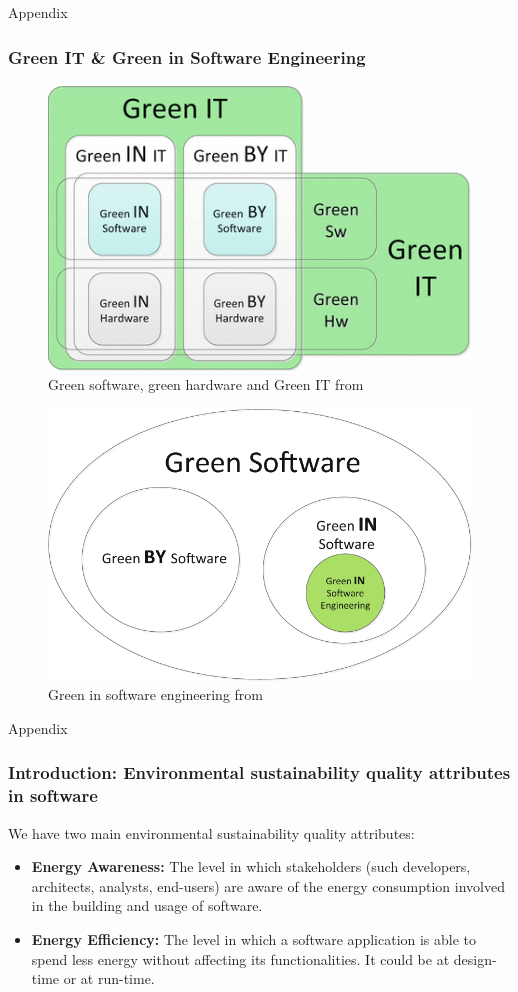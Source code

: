 \documentclass{beamer}
\begin{document}
\begin{frame}{Appendix}
\hypertarget{Intro_1}{}
  \frametitle{Green IT \& Green in Software Engineering}
  
 \begin{figure}
     \vspace*{-0.25cm} %
    \centering
    \includegraphics[width=.4\textwidth]{figures/Slide_2(Green software, green hardware and Green IT).png}
    \captionsetup{justification=centering} %
    \caption{\small Green software, green hardware and Green IT from \cite{calero2015introduction}}
    \label{fig:Green software, green hardware and Green IT}
 \end{figure}
 
 \begin{figure}
     \vspace*{-0.5cm} %
    \centering
    \includegraphics[width=.4\textwidth]{figures/Slide_2(Green in software engineering_1).png}
    \captionsetup{justification=centering} %
    \caption{\small Green in software engineering from \cite{calero2015introduction}}
    \label{fig:Green software, green hardware and Green IT}
 \end{figure}
\end{frame}
\begin{frame}{Appendix}
\hypertarget{Intro_2}{}
  \frametitle{Introduction: Environmental sustainability quality attributes in software}
  \vspace*{-2cm} %
  We have two main environmental sustainability quality attributes:
    \begin{itemize}
        \item \small \textbf{Energy Awareness:} \justifying The level in which stakeholders (such developers, architects, analysts, end-users) are aware of the energy consumption involved in the building and usage of software.
        \item \small \textbf{Energy Efficiency:} \justifying The level in which a software application is able to spend less energy without affecting its functionalities. It could be at design-time or at run-time.
    \end{itemize}
\end{frame}
\end{document}
